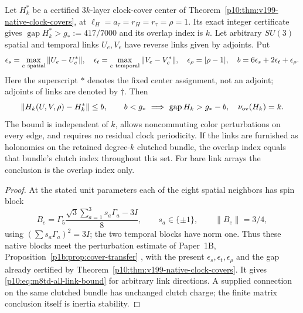 \documentclass[12pt,a4paper]{article}
\begin{document}
\begin{theorem}
\label{p10:thm:m8td-all-link-neighborhood}
Let $H_k^*$ be a certified $3k$-layer clock-cover center of
Theorem~\ref{p10:thm:v199-native-clock-covers}, at
$\ell_H=a_\tau=r_H=r_\tau=\rho=1$. Its exact integer certificate gives
$\operatorname{gap}H_k^*>g_*:=417/7000$ and its
overlap index is $k$. Let arbitrary $SU(3)$ spatial and temporal links
$U_e,V_e$ have reverse links given by adjoints. Put
\[
 \epsilon_s=\max_{e\ {\rm spatial}}\|U_e-U_e^*\|,\quad
 \epsilon_t=\max_{e\ {\rm temporal}}\|V_e-V_e^*\|,\quad
 \epsilon_\rho=|\rho-1|,\quad b=6\epsilon_s+2\epsilon_t+\epsilon_\rho.
\]
Here the superscript $*$ denotes the fixed center assignment, not an
adjoint; adjoints of links are denoted by $\dagger$. Then
\begin{equation}
 \|H_k(U,V,\rho)-H_k^*\|\le b,
 \qquad b<g_*\ \Longrightarrow\
 \operatorname{gap}H_k>g_*-b,\quad\nu_{\rm ov}(H_k)=k.
 \label{p10:eq:m8td-all-link-bound}
\end{equation}
The bound is independent of $k$, allows noncommuting color perturbations
on every edge, and requires no residual clock periodicity. If the links
are furnished as holonomies on the retained degree-$k$ clutched bundle,
the overlap index equals that bundle's clutch index throughout this set.
For bare link arrays the conclusion is the overlap index only.
\end{theorem}
\begin{proof}
At the stated unit parameters each of the eight spatial neighbors has
spin block
\[
 B_e=\Gamma_5\frac{\sqrt3\sum_{a=1}^3s_a\Gamma_a-3I}{8},
 \qquad s_a\in\{\pm1\},\qquad \|B_e\|=3/4,
\]
using $(\sum s_a\Gamma_a)^2=3I$; the two temporal blocks have norm one.
Thus these native blocks meet the perturbation estimate of Paper~1B,
Proposition~\ref{p1b:prop:cover-transfer} \cite{Kugelmann2026Paper1B},
with the present $\epsilon_s,\epsilon_t,\epsilon_\rho$ and the gap
already certified by Theorem~\ref{p10:thm:v199-native-clock-covers}.
It gives \eqref{p10:eq:m8td-all-link-bound} for arbitrary link directions.
A supplied connection on the same clutched bundle has unchanged clutch
charge; the finite matrix conclusion itself is inertia stability.
\end{proof}
\end{document}
